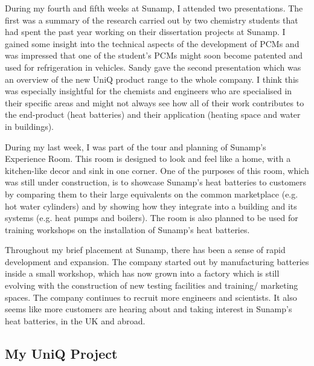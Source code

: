 During my fourth and fifth weeks at Sunamp, I attended two presentations.
The first was a summary of the research carried out by two chemistry students that had spent the past year working on their dissertation projects at Sunamp.
I gained some insight into the technical aspects of the development of PCMs and was impressed that one of the student's PCMs might soon become patented and used for refrigeration in vehicles.
Sandy gave the second presentation which was an overview of the new UniQ product range to the whole company.
I think this was especially insightful for the chemists and engineers who are specialised in their specific areas and might not always see how all of their work contributes to the end-product (heat batteries) and their application (heating space and water in buildings).

During my last week, I was part of the tour and planning of Sunamp's Experience Room.
This room is designed to look and feel like a home, with a kitchen-like decor and sink in one corner.
One of the purposes of this room, which was still under construction, is to showcase Sunamp's heat batteries to customers by comparing them to their large equivalents on the common marketplace (e.g. hot water cylinders) and by showing how they integrate into a building and its systems (e.g. heat pumps
and boilers).
The room is also planned to be used for training workshops on the installation of Sunamp's heat batteries.

Throughout my brief placement at Sunamp, there has been a sense of rapid development and expansion.
The company started out by manufacturing batteries inside a small workshop, which has now grown into a factory which is still evolving with the construction of new testing facilities and training/ marketing spaces.
The company continues to recruit more engineers and scientists.
It also seems like more customers are hearing about and taking interest in Sunamp's heat batteries, in the UK and abroad.






\subsection{My UniQ Project} \label{sec:sunamp_work}


